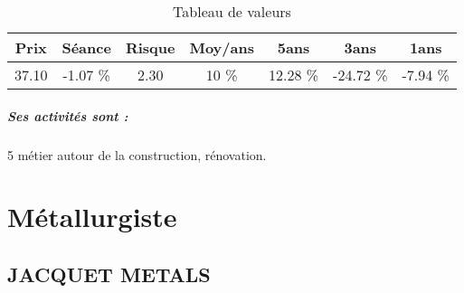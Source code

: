 \documentclass[11pt,a4paper]{report}%
\begin{document}
\begin{table}[H]
  \centering
    \begin{tabular}{|c|c|c|c|c|c|c|}
    \hline
    Prix & Séance & Risque  & Moy/ans & 5ans & 3ans & 1ans \\
    \hline
    37.10 &    -1.07 \%    & 2.30 & 10 \% & 12.28 \% & -24.72 \% & -7.94 \% \\
    \hline
    \end{tabular}%
        \label{tab:table_HEXAOM}%
      \caption{Tableau de valeurs}
\end{table}%

\paragraph{Ses activités sont : } 5 métier autour de la construction, rénovation. 
    
    \newpage\chapter{Métallurgiste}


\section{JACQUET METALS}
\end{document}
